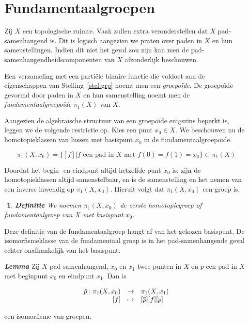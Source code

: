 \documentclass[12pt]{book}
\newenvironment{lem}{\begin{lemh}{\em {\bf Lemma }}}{\end{lemh}}
\newtheorem{dfh}[stelh]{$\!\!$}
\newenvironment{df}{\begin{dfh} \em {\bf Definitie }}{\end{dfh}}
\begin{document}
\section{Fundamentaalgroepen}
Zij $X$ een topologische ruimte. Vaak zullen extra veronderstellen dat $X$ pad-samenhangend is. Dit is logisch  aangezien we praten over paden in $X$ en hun samenstellingen. Indien dit niet het geval zou zijn kan men de pad-samenhangendheidscomponenten van $X$ afzonderlijk beschouwen.

Een verzameling met een parti\"ele binaire functie die voldoet aan de eigenschappen van Stelling~\ref{stel:grp} noemt men een \emph{groepo\"ide}. De groepo\"ide gevormd door paden in $X$ en hun samenstelling noemt men de \emph{fundamentaalgroepo\"ide} $\pi_1(X)$ van $X$.

Aangezien de algebra\"ische structuur van een groepo\"ide enigszins beperkt is, leggen we de volgende restrictie op. Kies een punt $x_0 \in X$. We beschouwen nu de homotopieklassen van lussen met  basispunt $x_0$ in de fundamentaalgroepo\"ide.

$$\pi_{1}(X,x_0)=\{[f]|f \mbox{ een pad in } X \mbox{ met } f(0)=f(1)=x_0\} \subset \pi_1(X)$$

Doordat het begin- en eindpunt altijd hetzelfde punt $x_0$ is, zijn de homotopieklassen altijd samenstelbaar, en is de samenstelling en het nemen van een inverse inwendig op $\pi_{1}(X,x_0)$. Hieruit volgt dat $\pi_1(X,x_0)$ een groep is.


\begin{df}
We noemen $\pi_1(X, x_0)$ de {\em eerste homotopiegroep} of {\em fundamentaalgroep} van $X$ met
basispunt $x_0$. 
\end{df}

Deze definitie van de fundamentaalgroep hangt af van het gekozen basispunt. De isomorfismeklasse van de fundamentaal groep is in het pad-samenhangende geval echter onafhankelijk van het basispunt. 

\begin{lem}\label{pix0-pix1}
Zij $X$ pad-samenhangend, $x_0$ en $x_1$ twee punten in $X$ en $p$ een pad in $X$ met beginpunt $x_0$ en eindpunt $x_1$. Dan is 

$$\begin{array}{rcl}
\hat{p}:\pi_{1}(X,x_0) & \to & \pi_{1}(X,x_1)\\
\rule{0mm}{0mm}[f] & \mapsto & [\overline{p}][f][p]\end{array} 
$$

een isomorfisme van groepen.
\end{lem}
\end{document}
